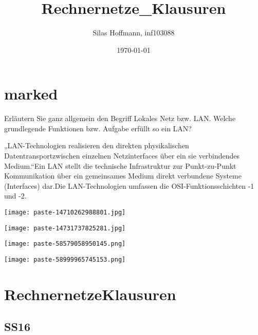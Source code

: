 \documentclass{article}
\title{Rechnernetze_Klausuren}
\author{Silas Hoffmann, inf103088}
\date{\today}
\begin{document}
\maketitle
\vspace{0.5cm}
\tableofcontents
\clearpage

\section{marked}
\begin{tcolorbox}[colback=white!10!white,colframe=lightgray!75!black,
  savelowerto=\jobname_ex.tex,breakable,enhanced,lines before break=40]

\justifying
Erläutern Sie ganz allgemein den Begriff Lokales Netz bzw. LAN. Welche grundlegende Funktionen bzw. Aufgabe erfüllt so ein LAN?

\tcblower

\justifying
„LAN-Technologien realisieren den direkten physikalischen Datentransportzwischen einzelnen Netzinterfaces über ein sie verbindendes Medium.“Ein LAN stellt die technische Infrastruktur zur Punkt-zu-Punkt Kommunikation über ein gemeinsames Medium direkt verbundene Systeme (Interfaces) dar.Die LAN-Technologien umfassen die OSI-Funktionsschichten -1 und -2.\begin{center}
\texttt{[image: paste-14710262988801.jpg]}
\end{center}
\begin{center}
\texttt{[image: paste-14731737825281.jpg]}
\end{center}
\begin{center}
\texttt{[image: paste-58579058950145.png]}
\end{center}
\begin{center}
\texttt{[image: paste-58999965745153.png]}
\end{center}

\end{tcolorbox}
\section{RechnernetzeKlausuren}
\subsection{SS16}
\end{document}
